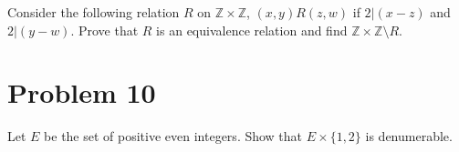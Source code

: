 \documentclass{article}
\begin{document}
    Consider the following relation $R$ on $\mathbb{Z}\times\mathbb{Z}$, $(x,y)R(z,w)$
    if $2|(x-z)$ and $2|(y-w)$. Prove that $R$ is an equivalence relation and find 
    $\mathbb{Z}\times\mathbb{Z}\setminus R$.


    \section*{Problem 10}

    Let $E$ be the set of positive even integers. Show that $E\times\{1,2\}$ is denumerable.
\end{document}
